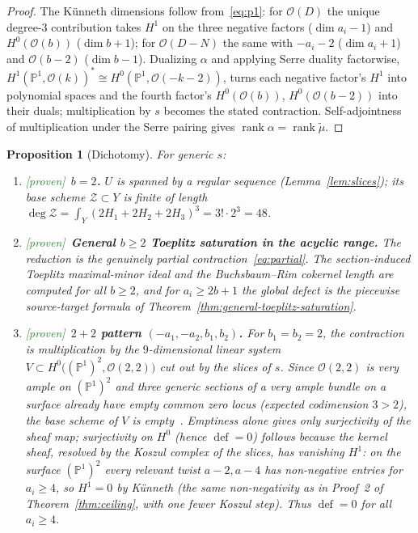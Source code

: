 \documentclass[11pt]{article}
\theoremstyle{plain}
\newtheorem{proposition}[theorem]{Proposition}
\theoremstyle{definition}
\theoremstyle{remark}
\newcommand{\Proven}{\textcolor{ForestGreen}{\textsf{[proven]}}}
\newcommand{\PP}{\mathbb{P}}
\newcommand{\cO}{\mathcal{O}}
\newcommand{\cZ}{\mathcal{Z}}
\newcommand{\rank}{\operatorname{rank}}
\newcommand{\defect}{\operatorname{def}}
\begin{document}
\begin{proof}
The K\"unneth dimensions follow from~\eqref{eq:p1}: for $\cO(D)$ the unique degree-$3$ contribution takes $H^1$ on the three negative factors ($\dim a_i-1$) and $H^0(\cO(b))$ ($\dim b+1$); for $\cO(D-N)$ the same with $-a_i-2$ ($\dim a_i+1$) and $\cO(b-2)$ ($\dim b-1$). Dualizing $\alpha$ and applying Serre duality factorwise, $H^1(\PP^1,\cO(k))^*\cong H^0(\PP^1,\cO(-k-2))$, turns each negative factor's $H^1$ into polynomial spaces and the fourth factor's $H^0(\cO(b))$, $H^0(\cO(b-2))$ into their duals; multiplication by $s$ becomes the stated contraction. Self-adjointness of multiplication under the Serre pairing gives $\rank\alpha=\rank\widetilde{\mu}$.
\end{proof}

\begin{proposition}[Dichotomy]\label{prop:dichotomy}
For generic $s$:
\begin{enumerate}[leftmargin=2.2em,itemsep=2pt]
\item \Proven\ \textbf{$b=2$.} $U$ is spanned by a regular sequence (Lemma~\ref{lem:slices}); its base scheme $\cZ\subset Y$ is finite of length $\deg\cZ=\int_Y(2H_1+2H_2+2H_3)^3=3!\cdot 2^3=48$.
\item \Proven\ \textbf{General $b\ge2$ Toeplitz saturation in the acyclic range.} The reduction is the genuinely partial contraction~\eqref{eq:partial}. The section-induced Toeplitz maximal-minor ideal and the Buchsbaum--Rim cokernel length are computed for all $b\ge2$, and for $a_i\ge2b+1$ the global defect is the piecewise source-target formula of Theorem~\ref{thm:general-toeplitz-saturation}.
\item \Proven\ \textbf{$2{+}2$ pattern $(-a_1,-a_2,b_1,b_2)$.} For $b_1=b_2=2$, the contraction is multiplication by the $9$-dimensional linear system $V\subset H^0\big((\PP^1)^2,\cO(2,2)\big)$ cut out by the slices of $s$. Since $\cO(2,2)$ is very ample on $(\PP^1)^2$ and three generic sections of a very ample bundle on a surface already have empty common zero locus (expected codimension $3>2$), the base scheme of $V$ is empty~\cite[III.10.9]{Hartshorne}. Emptiness alone gives only surjectivity of the \emph{sheaf} map; surjectivity on $H^0$ (hence $\defect=0$) follows because the kernel sheaf, resolved by the Koszul complex of the slices, has vanishing $H^1$: on the surface $(\PP^1)^2$ every relevant twist $a-2,a-4$ has non-negative entries for $a_i\ge 4$, so $H^1=0$ by K\"unneth (the same non-negativity as in Proof~2 of Theorem~\ref{thm:ceiling}, with one fewer Koszul step). Thus $\defect=0$ for all $a_i\ge 4$.
\end{enumerate}
\end{proposition}
\end{document}
